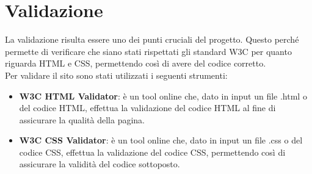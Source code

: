 \section{Validazione}
La validazione risulta essere uno dei punti cruciali del progetto. Questo perché permette di verificare che siano stati rispettati gli standard W3C per quanto riguarda HTML e CSS, permettendo così di avere del codice corretto.\\
Per validare il sito sono stati utilizzati i seguenti strumenti:
\begin{itemize}
	\item \textbf{W3C HTML Validator}: è un tool online che, dato in input un file .html o del codice HTML, effettua la validazione del codice HTML al fine di assicurare la qualità della pagina.
	\item \textbf{W3C CSS Validator}: è un tool online che, dato in input un file .css o del codice CSS, effettua la validazione del codice CSS, permettendo così di assicurare la validità del codice sottoposto.
\end{itemize}